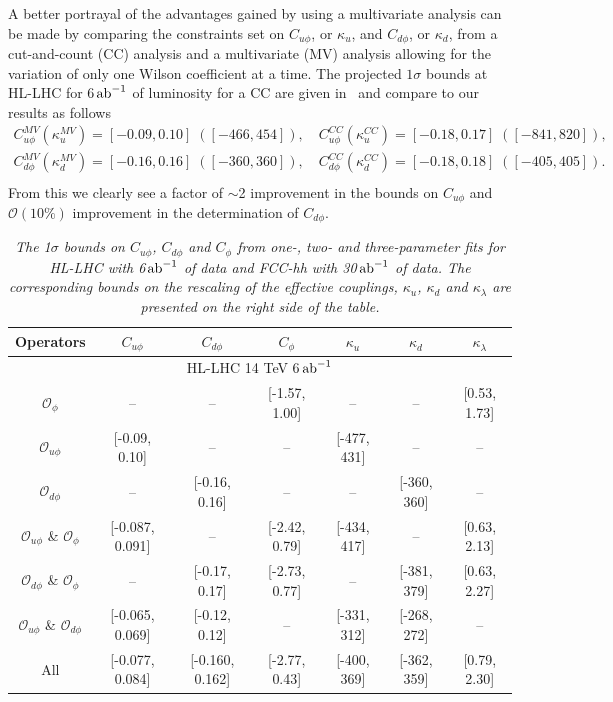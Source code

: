 A better portrayal of the advantages gained by using a multivariate analysis can be made by comparing the constraints set on $C_{u\phi}$, or $\kappa_u$, and $C_{d\phi}$, or $\kappa_d$, from a cut-and-count (CC) analysis  and a multivariate (MV) analysis allowing for the variation of only one Wilson coefficient at a time. The projected $1\sigma$ bounds at HL-LHC for 6$\,{\rm ab}^{-1}$ of luminosity for a CC are given in~\cite{Alasfar:2019pmn} and compare to our results as follows
\begin{eqnarray}
	C_{u\phi}^{MV} \left(\kappa_u^{MV}\right) = [-0.09, 0.10] \;([-466, 454]),\quad C_{u\phi}^{CC} (\kappa_u^{CC}) = [-0.18, 0.17] \;([-841, 820]), \nonumber\\
	C_{d\phi}^{MV} (\kappa_d^{MV}) = [-0.16, 0.16] \;([-360, 360]),\quad C_{d\phi}^{CC} (\kappa_d^{CC}) = [-0.18, 0.18] \;([-405, 405]). \nonumber\\
\end{eqnarray}
From this we clearly see a factor of $\sim$2 improvement in the bounds on $C_{u\phi}$ and $\mathcal O(10\%)$ improvement in the determination of $C_{d\phi}$.
\begin{table}[]
	\centering
	{\footnotesize
		\begin{tabular}{cccc||ccc}
			\toprule
			Operators &  $C_{u\phi}$&   $C_{d\phi}$&   $C_{\phi}$&    $\kappa_{u}$&   $\kappa_{d}$&   $\kappa_\lambda$\\
			\midrule
			\multicolumn{7}{c}{HL-LHC 14 TeV 6$\,{\rm ab}^{-1}$}\\
			\midrule
			$\mathcal O_{\phi}$ &--   & --            &[-1.57, 1.00] &--  & -- &[0.53, 1.73]\\
			$\mathcal O_{u\phi}$&[-0.09, 0.10]   & --            &-- &[-477, 431]  & -- &--\\
			$\mathcal O_{d\phi}$&--   & [-0.16, 0.16]            &-- &--  & [-360, 360] &--\\
			$\mathcal O_{u\phi}$ \& $\mathcal O_{\phi}$ &[-0.087, 0.091]  & --            &[-2.42, 0.79] &[-434, 417] & -- &[0.63, 2.13]\\
			$\mathcal O_{d\phi}$ \& $\mathcal O_{\phi}$ & --             &[-0.17, 0.17]  &[-2.73, 0.77]& -- &[-381, 379] &[0.63, 2.27]\\
			$\mathcal O_{u\phi}$ \& $\mathcal O_{d\phi}$&[-0.065, 0.069]&[-0.12, 0.12]& --            &[-331, 312] &[-268, 272] & -- \\
			All                                   &[-0.077, 0.084]&[-0.160, 0.162]& [-2.77, 0.43]&[-400, 369] &[-362, 359] & [0.79, 2.30] \\
			\bottomrule
		\end{tabular}
	}
	\caption{\it The 1$\sigma$ bounds on $C_{u\phi}$, $C_{d\phi}$ and $C_\phi$ from one-, two- and three-parameter fits for HL-LHC with 6$\,{\rm ab}^{-1}$ of data and FCC-hh with 30$\,{\rm ab}^{-1}$ of data. The corresponding bounds on the rescaling of the effective couplings, $\kappa_u$, $\kappa_d$ and $\kappa_\lambda$ are presented on the right side of the table.}
	\label{tab:twoparambounds}
\end{table}

